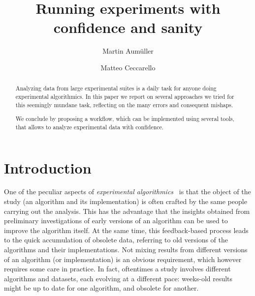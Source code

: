 \documentclass{llncs}
\begin{document}
\title{Running experiments with confidence and sanity}
%
%
\author{
  Martin Aumüller \and
  Matteo Ceccarello}
%
%
%
\maketitle              %
%
\begin{abstract}
Analyzing data from large experimental suites is a daily task for
anyone doing experimental algorithmics.
In this paper we report on several approaches we tried for this 
seemingly mundane task, reflecting on the many errors and consequent
mishaps.

We conclude by proposing a workflow, which can be implemented using several
tools, that allows to analyze experimental data with confidence.

\end{abstract}

\section{Introduction}

One of the peculiar aspects of \emph{experimental algorithmics}~\cite{DBLP:conf/dimacs/Moret99}
is that the object of the study (an algorithm and its implementation)
is often crafted by the same people carrying out the analysis.
This has the advantage that the insights obtained from preliminary
investigations of early versions of an algorithm can be used to improve the
algorithm itself.
At the same time, this feedback-based process leads to the quick
accumulation of obsolete data, referring to old versions of the
algorithms and their implementations.
Not mixing results from different versions of
an algorithm (or implementation) is an obvious requirement, which
however requires some care in practice.
In fact, oftentimes a study involves different algorithms and datasets,
each evolving at a different pace: weeks-old results might be up to date
for one algorithm, and obsolete for another.
\end{document}
